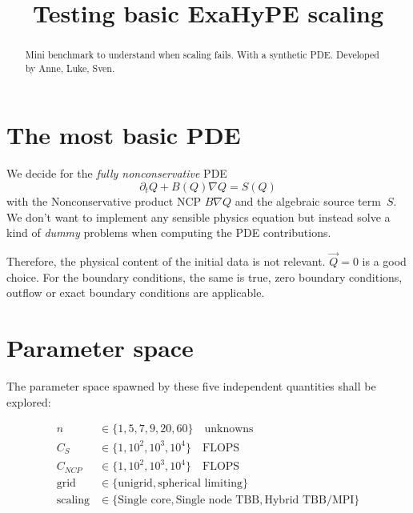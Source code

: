 \documentclass{article}
\begin{document}
\title {Testing basic ExaHyPE scaling} 

\maketitle

\begin{abstract}
Mini benchmark to understand when scaling fails. With a synthetic
PDE. Developed by Anne, Luke, Sven.
\end{abstract}


\section{The most basic PDE}

We decide for the \emph{fully nonconservative} PDE
\begin{equation}\label{pde}
\partial_t Q + B(Q)\nabla Q = S(Q)
\end{equation}
%
with the Nonconservative product NCP $B\nabla Q$ and the
algebraic source term~$S$. We don't want to implement any
sensible physics equation but instead solve a kind of
\emph{dummy} problems when computing the PDE contributions.

Therefore, the physical content of the initial data is not
relevant. $\vec Q=0$ is a good choice. For the boundary
conditions, the same is true, zero boundary conditions,
outflow or exact boundary conditions are applicable.

\section{Parameter space}

The parameter space spawned by these five independent
quantities shall be explored:

\begin{align}
n& \in \{ 1,5,7,9,20, 60 \} \quad\text{unknowns}
\\
C_S &\in \{ 1, 10^2, 10^3, 10^4 \} \quad\text{FLOPS}
\\
C_{NCP} &\in \{ 1, 10^2, 10^3, 10^4 \} \quad\text{FLOPS}
\\
\text{grid} &\in  \{ \text{unigrid}, \text{spherical limiting} \}
\\
\text{scaling} &\in  \{ \text{Single core}, \text{Single node TBB}, \text{Hybrid TBB/MPI} \}
\end{align}
%
\end{document}
